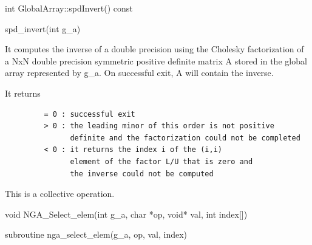 \documentclass[12pt]{article}
\begin{document}
\begin{cxxapi}
\begin{cxxcode}
int GlobalArray::spdInvert() const
\end{cxxcode}
\begin{funcargs}
\end{funcargs}
\end{cxxapi}

\begin{pyapi}
\begin{pycode}
spd_invert(int g_a) 
\end{pycode}
\end{pyapi} 


\gcoll

\begin{desc}


It computes the inverse of a double precision using the Cholesky 
factorization of a NxN double precision symmetric positive definite 
matrix A stored in the global array represented by g_a. On successful 
exit, A will contain the inverse.

It returns
\begin{verbatim}
         = 0 : successful exit
         > 0 : the leading minor of this order is not positive
               definite and the factorization could not be completed
         < 0 : it returns the index i of the (i,i)
               element of the factor L/U that is zero and
               the inverse could not be computed
\end{verbatim}

This is a collective operation.
\end{desc}


\begin{capi}
\begin{ccode}

void NGA_Select_elem(int g_a, char *op, void* val, int index[])
\end{ccode}
\begin{funcargs}
\end{funcargs}
\end{capi}

\begin{fapi}
\begin{fcode}
subroutine nga_select_elem(g_a, op, val, index)
\end{fcode}
\begin{funcargs}
\end{funcargs}
\end{fapi}
\end{document}
